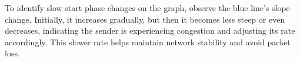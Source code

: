 To identify slow start phase changes on the graph, observe the blue line's slope change. Initially, it increases gradually, but then it becomes less steep or even decreases, indicating the sender is experiencing congestion and adjusting its rate accordingly. This slower rate helps maintain network stability and avoid packet loss.